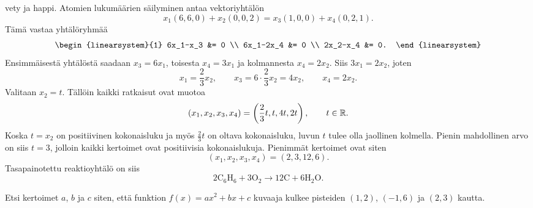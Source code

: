 \documentclass[11pt,a4paper]{amsart}
\begin{document}
\begin{solution}
\begin{enumerate}[label=\alph*)]
  vety ja happi. Atomien lukumäärien säilyminen antaa vektoriyhtälön
  \[
    x_1
    (6,6,0)
    +x_2
    (0,0,2)
    =x_3
    (1,0,0)
    +x_4
    (0,2,1).
  \]
  Tämä vastaa yhtälöryhmää
  \[
    \begin{linearsystem}{1}
      6x_1-x_3 &= 0 \\
      6x_1-2x_4 &= 0 \\
      2x_2-x_4 &= 0.
    \end{linearsystem}
  \]
  Ensimmäisestä yhtälöstä saadaan \(x_3=6x_1\), toisesta
  \(x_4=3x_1\) ja kolmannesta \(x_4=2x_2\).
  Siis \(3x_1=2x_2\), joten
  \[
    x_1=\frac23x_2, \qquad
    x_3=6\cdot\frac23x_2=4x_2, \qquad
    x_4=2x_2.
  \]
  Valitaan \(x_2=t\). Tällöin kaikki ratkaisut ovat muotoa
  \[
    (x_1,x_2,x_3,x_4)=\left(\frac23t,t,4t,2t\right),
    \qquad t\in\mathbb{R}.
  \]
  Koska \(t=x_2\) on positiivinen kokonaisluku ja myös \(\frac23t\)
  on oltava kokonaisluku, luvun \(t\) tulee olla jaollinen kolmella.
  Pienin mahdollinen arvo on siis \(t=3\), jolloin kaikki kertoimet
  ovat positiivisia kokonaislukuja. Pienimmät kertoimet ovat siten
  \[
    (x_1,x_2,x_3,x_4)=(2,3,12,6).
  \]
  Tasapainotettu reaktioyhtälö on siis
  \[
    2\mathrm{C}_6\mathrm{H}_6+3\mathrm{O}_2
    \longrightarrow 12\mathrm{C}+6\mathrm{H}_2\mathrm{O}.
  \]
\end{enumerate}
\end{solution}

\begin{exercise}
Etsi kertoimet \(a\), \(b\) ja \(c\) siten, että funktion
\(f(x) = ax^2 + bx + c\) kuvaaja kulkee pisteiden \((1,2)\),
\((-1,6)\) ja \((2,3)\) kautta.
\end{exercise}
\end{document}
